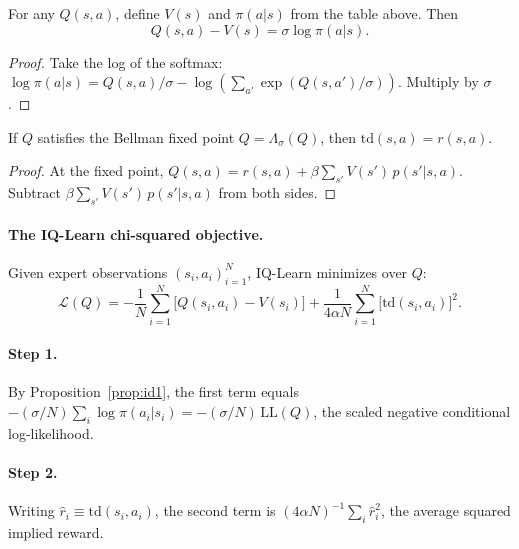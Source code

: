 \documentclass[11pt]{article}
\begin{document}
\begin{proposition}
\label{prop:id1}
For any $Q(s,a)$, define $V(s)$ and $\pi(a|s)$ from the table above. Then
\begin{equation}
Q(s,a) - V(s) = \sigma \log \pi(a|s).
\label{eq:id1}
\end{equation}
\end{proposition}

\begin{proof}
Take the log of the softmax: $\log \pi(a|s) = Q(s,a)/\sigma - \log(\sum_{a'} \exp(Q(s,a')/\sigma))$. Multiply by $\sigma$.
\end{proof}

\begin{proposition}
\label{prop:id2}
If $Q$ satisfies the Bellman fixed point $Q = \Lambda_\sigma(Q)$, then $\mathrm{td}(s,a) = r(s,a)$.
\end{proposition}

\begin{proof}
At the fixed point, $Q(s,a) = r(s,a) + \beta \sum_{s'} V(s')\,p(s'|s,a)$. Subtract $\beta \sum_{s'} V(s')\,p(s'|s,a)$ from both sides.
\end{proof}

\paragraph{The IQ-Learn chi-squared objective.} Given expert observations $(s_i, a_i)_{i=1}^N$, IQ-Learn minimizes over $Q$:
\begin{equation}
\mathcal{L}(Q) = -\frac{1}{N}\sum_{i=1}^{N}\bigl[Q(s_i,a_i) - V(s_i)\bigr] + \frac{1}{4\alpha N}\sum_{i=1}^{N}\bigl[\mathrm{td}(s_i,a_i)\bigr]^2.
\label{eq:iqlearn}
\end{equation}

\paragraph{Step 1.} By Proposition~\ref{prop:id1}, the first term equals $-(\sigma/N)\sum_i \log\pi(a_i|s_i) = -(\sigma/N)\,\mathrm{LL}(Q)$, the scaled negative conditional log-likelihood.

\paragraph{Step 2.} Writing $\hat{r}_i \equiv \mathrm{td}(s_i,a_i)$, the second term is $(4\alpha N)^{-1}\sum_i \hat{r}_i^2$, the average squared implied reward.
\end{document}
